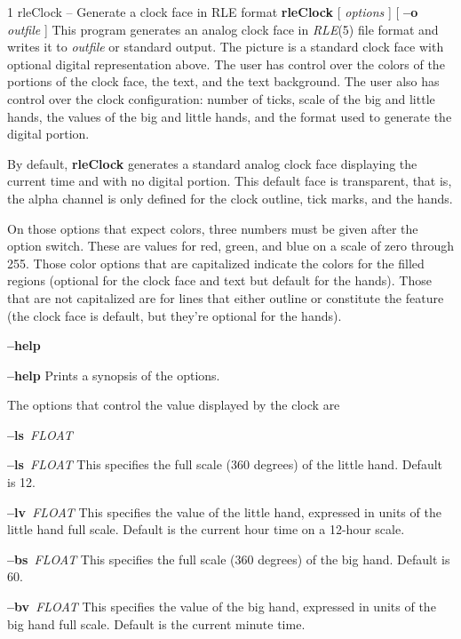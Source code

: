 %
%
%
 1
rleClock -- Generate a clock face in RLE format
{\bf rleClock}
[
{\it options}
] [
{\bf --o}
{\it outfile}
]
This program generates an analog clock face in
{\it RLE}{\rm (5)}
file format and writes it to 
{\it outfile} 
or standard output.
The picture is a standard clock face with optional digital representation
above.
The user has control over the colors of the portions of the clock face, the
text, and the text background.
The user also has control over the clock configuration: number of ticks, scale
of the big and little hands, the values of the big and little hands, and the
format used to generate the digital portion.
\par
By default,
{\bf rleClock}
generates a standard analog clock face displaying the current time and
with no digital portion.
This default face is transparent, that is, the alpha channel is only defined
for the clock outline, tick marks, and the hands.
\par
On those options that expect colors, three numbers must be given after the
option switch.
These are values for red, green, and blue on a scale of zero through 255.
Those color options that are capitalized indicate the colors for the filled
regions (optional for the clock face and text but default for the hands).
Those that are not capitalized are for lines that either outline or constitute
the feature (the clock face is default, but they're optional for the hands).
\begin{TPlist}{{\bf --help}
}
\item[{{\bf --help}
}]
Prints a synopsis of the options.
\end{TPlist}\par
The options that control the value displayed by the clock are
\begin{TPlist}{{\bf --ls}{\it \ FLOAT}
}
\item[{{\bf --ls}{\it \ FLOAT}
}]
This specifies the full scale (360 degrees) of the little hand.
Default is 12.
\item[{{\bf --lv}{\it \ FLOAT}
}]
This specifies the value of the little hand, expressed in units of the little hand
full scale.
Default is the current hour time on a 12-hour scale.
\item[{{\bf --bs}{\it \ FLOAT}
}]
This specifies the full scale (360 degrees) of the big hand.
Default is 60.
\item[{{\bf --bv}{\it \ FLOAT}
}]
This specifies the value of the big hand, expressed in units of the big hand
full scale.
Default is the current minute time.
\end{TPlist}\par\noindent
